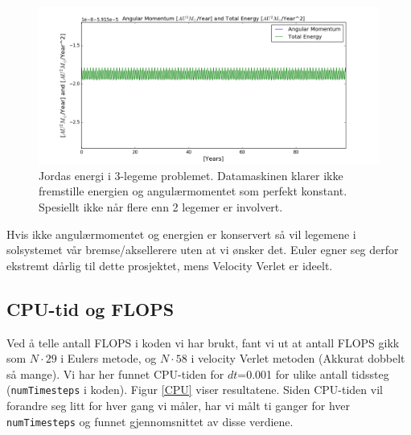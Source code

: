 \documentclass[11pt,a4paper]{article}
\begin{document}
\FloatBarrier
\begin{figure}[!ht]
 \centering
 \includegraphics[scale=0.4]{wat.png}
 \caption{Jordas energi i 3-legeme problemet. Datamaskinen klarer ikke fremstille energien og angulærmomentet som perfekt konstant. Spesiellt ikke når flere enn 2 legemer er involvert.}
 \label{ang3}
 \end{figure}
 \FloatBarrier
 
Hvis ikke angulærmomentet og energien er konservert så vil legemene i solsystemet vår bremse/aksellerere uten at vi ønsker det. Euler egner seg derfor ekstremt dårlig til dette prosjektet, mens Velocity Verlet er ideelt.

\subsection{CPU-tid og FLOPS}
Ved å telle antall FLOPS i koden vi har brukt, fant vi ut at antall FLOPS gikk som $N\cdot 29$ i Eulers metode, og $N\cdot 58$  
i velocity Verlet metoden (Akkurat dobbelt så mange). Vi har her funnet CPU-tiden for $dt$=0.001 for ulike antall tidssteg (\texttt{numTimesteps} i koden). Figur \ref{CPU} viser resultatene. Siden CPU-tiden vil forandre seg litt for hver gang vi måler, har vi målt ti ganger for hver \texttt{numTimesteps} og funnet gjennomsnittet av disse verdiene. 
\end{document}
